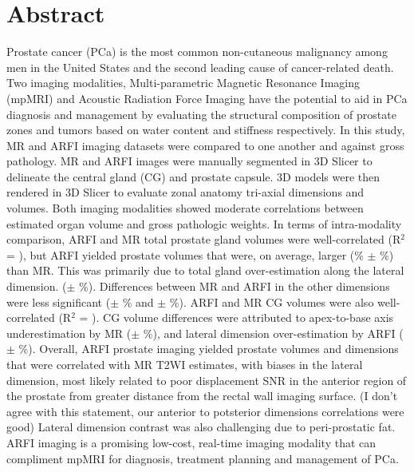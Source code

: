 \section*{Abstract}
Prostate cancer (PCa) is the most common non-cutaneous malignancy among men in
the United States and the second leading cause of cancer-related death.
Two imaging modalities, Multi-parametric Magnetic Resonance Imaging (mpMRI) and
Acoustic Radiation Force Imaging have the potential to aid in PCa
diagnosis and management by evaluating the structural composition of prostate
zones and tumors based on water content and stiffness respectively.  In this study, 
MR and ARFI imaging datasets were compared to one another and against gross pathology.  
MR and ARFI images were manually segmented in 3D Slicer to delineate the central gland (CG) and prostate capsule. 3D
models were then rendered in 3D Slicer to evaluate zonal anatomy tri-axial dimensions and
volumes.  Both imaging modalities showed moderate correlations between
estimated organ volume and gross pathologic weights.  In terms of intra-modality comparison,
ARFI and MR total prostate gland volumes were well-correlated (R$^2$ = \MRarfiVolTotalRsq), but
ARFI yielded prostate volumes that were, on average, larger
(\MRarfiVolTotalMeanDiff\% $\pm$ \MRarfiVolTotalStdDiff\%) than MR. This was
primarily due to total gland over-estimation along the lateral dimension.
(\ARFImrTotalLatLatMeanPct $\pm$ \ARFImrTotalLatLatStdPct\%). Differences between MR and
ARFI in the other dimensions were less significant (\ARFImrTotalAntPostMeanPct $\pm$
\ARFImrTotalAntPostStdPct\% and \ARFImrTotalApexBaseMeanPct $\pm$
\ARFImrTotalApexBaseStdPct\%). ARFI and MR CG volumes were also
well-correlated (R$^2$ = \MRarfiVolCentralRsq).  CG volume differences were
attributed to apex-to-base axis underestimation by MR
(\ARFImrCentralApexBaseMeanPct $\pm$ \ARFImrCentralApexBaseStdPct\%), and
lateral dimension over-estimation by ARFI (\ARFImrCentralLatLatMeanPct
$\pm$ \ARFImrCentralLatLatStdPct\%).  Overall, ARFI prostate imaging yielded prostate
volumes and dimensions that were correlated with MR T2WI estimates, with biases
in the lateral dimension, most likely related to poor displacement SNR in the
anterior region of the prostate from greater distance from the rectal wall
imaging surface. (I don't agree with this statement, our anterior to potsterior dimensions correlations were good)  Lateral dimension contrast was also challenging due to
peri-prostatic fat.  ARFI imaging is a promising low-cost, real-time imaging
modality that can compliment mpMRI for diagnosis, treatment planning and
management of PCa.

